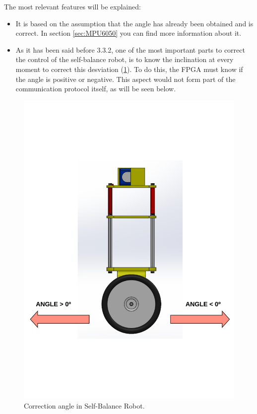 The most relevant features will be explained: 

\begin{itemize}
	\item It is based on the assumption that the angle has already been obtained and is correct. In section \ref{sec:MPU6050} you can find more information about it.
	\item As it has been said before 3.3.2, one of the most important parts to correct the control of the self-balance robot, is to know the inclination at every moment to correct this desviation (\ref{fig:angle_correction}). To do this, the FPGA must know if the angle is positive or negative. This aspect would not form part of the communication protocol itself, as will be seen below. 
\end{itemize}
	
	\begin{figure}[H]
		\center
		\includegraphics[trim = 0cm 4cm 0mm 4cm, clip,scale=0.5]{imagenes/Balancing_robot/angle_correction.pdf}
		\caption{Correction angle in Self-Balance Robot.}
		\label{fig:angle_correction}
	\end{figure}
	

